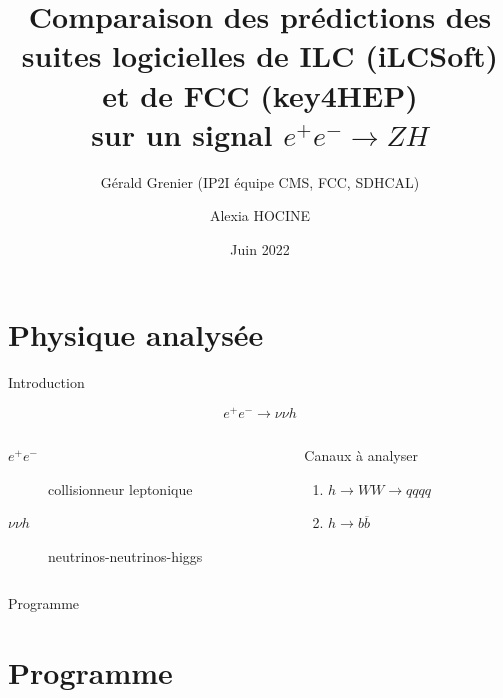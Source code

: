 \documentclass[9pt]{beamer}
\author[Hocine]{Alexia HOCINE}
\title{
	Comparaison des prédictions des suites logicielles de ILC (iLCSoft) et de FCC (key4HEP) \\
	sur un signal $ e^{+} e^{-} \longrightarrow Z H $ 
}
\subtitle{Gérald Grenier (IP2I équipe CMS, FCC, SDHCAL)}
\institute[UCBL]{Université de Claude Bernard Lyon 1}
\date[2022]{Juin 2022}
\newcommand{\bbar}{\overline{b}}
\begin{document}

\begin{frame}
	\titlepage
\end{frame}

\section{Physique analysée}

\begin{frame}{Introduction}

	$$ e^{+} e^{-} \longrightarrow \nu \nu h $$

	\begin{columns}
		
		\begin{column}{0.55\textwidth}
			\begin{description}
				\item[$e^{+} e^{-}$] collisionneur leptonique
				\item[$\nu \nu h$] neutrinos-neutrinos-higgs
			\end{description}
		\end{column}
		
		\begin{column}{0.4\textwidth}
			\begin{block}{Canaux à analyser}
				\begin{enumerate}
					\item $h \longrightarrow WW \longrightarrow qqqq$
					\item $h \longrightarrow b\bbar$
				\end{enumerate}
			\end{block}
		\end{column}
	\end{columns}

\end{frame}


\begin{frame}{Programme}
	\tableofcontents
\end{frame}

\section{Programme}
\end{document}

